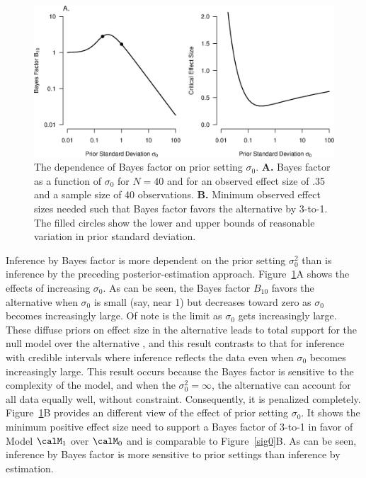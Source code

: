 \begin{figure}[!t]
\centering
\includegraphics[width=\textwidth]{figs/bi4_fig3}
\caption{The dependence of Bayes factor on prior setting $\sigma_0$.  \textbf{A.} Bayes factor as a function of $\sigma_0$ for $N=40$ and for an observed effect size of .35 and a sample size of 40 observations.  \textbf{B.} Minimum observed effect sizes needed such that Bayes factor favors the alternative by 3-to-1.  The filled circles show the lower and upper bounds of reasonable variation in prior standard deviation. }
\label{fig:bi4:bf}
\end{figure}

Inference by Bayes factor is more dependent on the prior setting $\sigma^2_0$ than is inference by the preceding posterior-estimation approach.  Figure~\ref{fig:bi4:bf}A shows the effects of increasing $\sigma_0$. As can be seen, the Bayes factor $B_{10}$ favors the alternative when $\sigma_0$ is small (say, near 1) but decreases toward zero as $\sigma_0$ becomes increasingly large. Of note is the limit as $\sigma_0$ gets increasingly large.  These diffuse priors on effect size in the alternative leads to total support for the null model over the alternative \cite{Lindley:1957}, and this result contrasts to that for inference with credible intervals where inference reflects the data even when $\sigma_0$ becomes increasingly large.  This result occurs because the Bayes factor is sensitive to the complexity of the model, and when the $\sigma_0^2=\infty$, the alternative can account for all data equally well, without constraint.  Consequently, it is penalized completely.  Figure~\ref{fig:bi4:bf}B provides an different view of the effect of prior setting $\sigma_0$.  It shows the minimum positive effect size need to support a Bayes factor of 3-to-1 in favor of Model $\calM_1$ over $\calM_0$ and is comparable to Figure~\ref{sig0}B.  As can be seen, inference by Bayes factor is more sensitive to prior settings than inference by estimation. 

